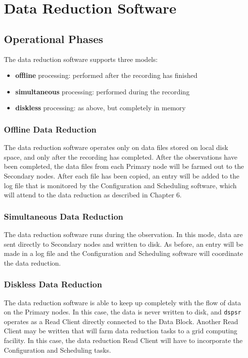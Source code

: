 \chapter{Data Reduction Software}

\section{Operational Phases}

The data reduction software supports three models:

\begin{itemize}
\item {\bf offline} processing: performed after the recording has finished
\item {\bf simultaneous} processing: performed during the recording
\item {\bf diskless} processing: as above, but completely in memory
\end{itemize}

\subsection{Offline Data Reduction}

The data reduction software operates only on data files stored on
local disk space, and only after the recording has completed.  After
the observations have been completed, the data files from each Primary
node will be farmed out to the Secondary nodes.  After each file has
been copied, an entry will be added to the log file that is monitored
by the Configuration and Scheduling software, which will attend to the
data reduction as described in Chapter 6.

\subsection{Simultaneous Data Reduction}

The data reduction software runs during the observation.  In this
mode, data are sent directly to Secondary nodes and written to disk.
As before, an entry will be made in a log file and the Configuration
and Scheduling software will coordinate the data reduction.

\subsection{Diskless Data Reduction}

The data reduction software is able to keep up completely with the
flow of data on the Primary nodes.  In this case, the data is never
written to disk, and {\tt dspsr} operates as a Read Client directly
connected to the Data Block.  Another Read Client may be written that
will farm data reduction tasks to a grid computing facility.  In this
case, the data reduction Read Client will have to incorporate the
Configuration and Scheduling tasks.

